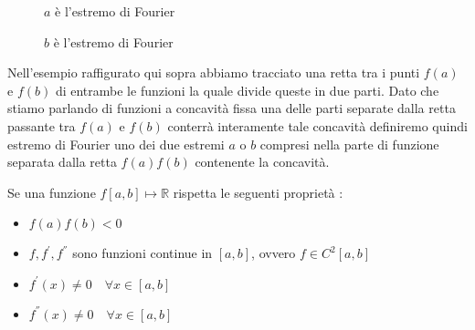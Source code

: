 \documentclass[12pt, a4paper]{book}
\theoremstyle{definition}
\begin{document}
\begin{flushleft}
\begin{figure}[h!]
\begin{minipage}{0.40\textwidth}
        \caption{$a$ è l'estremo di Fourier}
        \label{estremofa}
    \end{minipage}\hfill
    \begin{minipage}{0.40\textwidth}
        \centering
        \caption{$b$ è l'estremo di Fourier}
        \label{estremofb}
    \end{minipage}
\end{figure}

Nell'esempio raffigurato qui sopra abbiamo tracciato una retta tra i punti $f(a)$ e $f(b)$ di entrambe le funzioni la quale divide queste in due parti. Dato che stiamo parlando di funzioni a concavità fissa una delle parti separate dalla retta passante tra $f(a)$ e $f(b)$ conterrà interamente tale concavità definiremo quindi estremo di Fourier uno dei due estremi $a$ o $b$ compresi nella parte di funzione separata dalla retta $f(a)f(b)$ contenente la concavità. 

Se una funzione $f[a,b] \mapsto \mathbb{R}$ rispetta le seguenti proprietà : 
\begin{itemize}
	\item $f(a)f(b)<0$
	\item $f,f^{'},f^{''}$ sono funzioni continue in $[a,b]$, ovvero $f \in C^{2}[a,b]$  
	\item $f^{'}(x) \neq 0 \quad \forall x \in [a,b]$  
	\item $f^{''}(x) \neq 0 \quad \forall x \in [a,b]$  
\end{itemize}


\end{flushleft}
\end{document}
